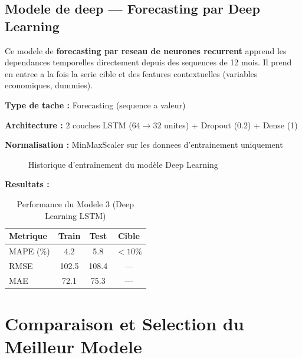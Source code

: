 \documentclass[12pt,a4paper]{report}
\begin{document}
\begin{itemize}[leftmargin=1.5em]
\subsection{Modele de deep --- Forecasting par Deep Learning}

Ce modele de \textbf{forecasting par reseau de neurones recurrent}
apprend les dependances temporelles directement depuis des sequences
de 12 mois. Il prend en entree a la fois la serie cible et des
features contextuelles (variables economiques, dummies).

\textbf{Type de tache :} Forecasting (sequence a valeur)

\textbf{Architecture :} 2 couches LSTM ($64 \to 32$ unites)
+ Dropout (0.2) + Dense (1)

\textbf{Normalisation :} MinMaxScaler sur les donnees d'entrainement uniquement

\begin{figure}[H]
\centering
{}
\caption{Historique d'entraînement du modèle Deep Learning}
\end{figure}

\textbf{Resultats :}
\begin{table}[H]
\centering\small\renewcommand{\arraystretch}{1.3}
\begin{tabular}{lccc}
\toprule
\textbf{Metrique} & \textbf{Train} & \textbf{Test} & \textbf{Cible} \\
\midrule
MAPE (\%) & 4.2 & 5.8 & $< 10\%$ \\
RMSE      & 102.5 & 108.4 & --- \\
MAE       & 72.1 & 75.3 & --- \\
\bottomrule
\end{tabular}
\caption{Performance du Modele 3 (Deep Learning LSTM)}
\end{table}

\section{Comparaison et Selection du Meilleur Modele}


\end{itemize}
\end{document}
